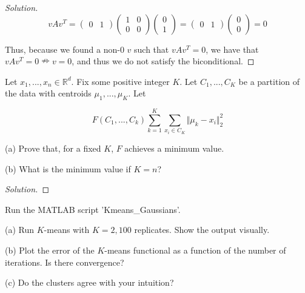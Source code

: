 \documentclass[10pt]{article}
\newenvironment{problem}[2][]{\begin{trivlist}
\item[\hskip \labelsep {\bfseries #1}\hskip \labelsep {\bfseries #2.}]}{\end{trivlist}}
\begin{document}
\begin{proof}[Solution]
$$  v A v^T = \begin{pmatrix} 0 & 1 \end{pmatrix} \begin{pmatrix} 1 & 0 \\ 0 & 0 \end{pmatrix} \begin{pmatrix} 0 \\ 1\end{pmatrix} =   \begin{pmatrix} 0 & 1 \end{pmatrix}\begin{pmatrix} 0 \\ 0\end{pmatrix} = 0$$

Thus, because we found a non-0 $v$ such that $ v A v^T = 0$, we have that $v A v^T  = 0 \nRightarrow v = 0$, and thus we do not satisfy the biconditional.

\end{proof}

\begin{problem}{Question 4}

Let $x_1,...,x_n \in \mathbb{R}^d$. Fix some positive integer $K$. Let $C_1,...,C_K$ be a partition of the data with centroids $\mu_1,...,\mu_K$. Let

$$ F(C_1,...,C_k)  \sum_{k=1}^K \sum_{x_i \in C_K} \Vert \mu_k - x_i \Vert_2^2 $$

(a) Prove that, for a fixed $K$, $F$ achieves a minimum value.

(b) What is the minimum value if $K = n$?

\end{problem}

\begin{proof}[Solution]


\end{proof}

\begin{problem}{Question 5}
 
Run the MATLAB script 'Kmeans\_Gaussians'.

(a) Run $K$-means with $K=2, 100$ replicates. Show the output visually.

(b) Plot the error of the $K$-means functional as a function of the number of iterations. Is there convergence?

(c) Do the clusters agree with your intuition?

\end{problem}
\end{document}
